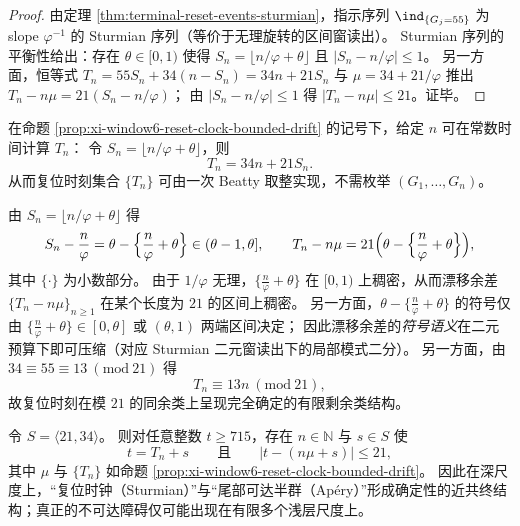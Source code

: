 \begin{proof}
由定理 \ref{thm:terminal-reset-events-sturmian}，指示序列 \(\ind_{\{G_j=55\}}\) 为 slope \(\varphi^{-1}\) 的 Sturmian 序列（等价于无理旋转的区间窗读出）。
Sturmian 序列的平衡性给出：存在 \(\theta\in[0,1)\) 使得
\(
S_n=\lfloor n/\varphi+\theta\rfloor
\)
且 \(|S_n-n/\varphi|\le 1\)。
另一方面，恒等式 \(T_n=55S_n+34(n-S_n)=34n+21S_n\) 与 \(\mu=34+21/\varphi\) 推出
\(
T_n-n\mu=21(S_n-n/\varphi)
\)；
由 \(|S_n-n/\varphi|\le 1\) 得 \(|T_n-n\mu|\le 21\)。证毕。
\end{proof}

\begin{corollary}\label{cor:xi-window6-reset-clock-O1-computable}
在命题 \ref{prop:xi-window6-reset-clock-bounded-drift} 的记号下，给定 \(n\) 可在常数时间计算 \(T_n\)：
令 \(S_n=\lfloor n/\varphi+\theta\rfloor\)，则
\[
T_n=34n+21S_n.
\]
从而复位时刻集合 \(\{T_n\}\) 可由一次 Beatty 取整实现，不需枚举 \((G_1,\dots,G_n)\)。
\end{corollary}

\begin{remark}[漂移余差的旋转表示与同余不变量]\label{rem:xi-window6-reset-clock-residual-rotation-congruence}
由 \(S_n=\lfloor n/\varphi+\theta\rfloor\) 得
\[
S_n-\frac{n}{\varphi}=\theta-\Bigl\{\frac{n}{\varphi}+\theta\Bigr\}\in(\theta-1,\theta],
\qquad
T_n-n\mu=21\Bigl(\theta-\Bigl\{\frac{n}{\varphi}+\theta\Bigr\}\Bigr),
\]
其中 \(\{\cdot\}\) 为小数部分。
由于 \(1/\varphi\) 无理，\(\{\frac{n}{\varphi}+\theta\}\) 在 \([0,1)\) 上稠密，从而漂移余差 \(\{T_n-n\mu\}_{n\ge 1}\) 在某个长度为 \(21\) 的区间上稠密。
另一方面，\(\theta-\{\frac{n}{\varphi}+\theta\}\) 的符号仅由
\(\{\frac{n}{\varphi}+\theta\}\in[0,\theta]\) 或 \((\theta,1)\) 两端区间决定；
因此漂移余差的\emph{符号语义}在二元预算下即可压缩（对应 Sturmian 二元窗读出下的局部模式二分）。
另一方面，由 \(34\equiv 55\equiv 13\ (\mathrm{mod}\ 21)\) 得
\[
T_n\equiv 13n\ (\mathrm{mod}\ 21),
\]
故复位时刻在模 \(21\) 的同余类上呈现完全确定的有限剩余类结构。
\end{remark}

\begin{corollary}\label{cor:xi-window6-reset-clock-semigroup-coupling}
令 \(S=\langle 21,34\rangle\)。
则对任意整数 \(t\ge 715\)，存在 \(n\in\mathbb N\) 与 \(s\in S\) 使
\[
t=T_n+s
\qquad\text{且}\qquad
\bigl|t-(n\mu+s)\bigr|\le 21,
\]
其中 \(\mu\) 与 \(\{T_n\}\) 如命题 \ref{prop:xi-window6-reset-clock-bounded-drift}。
因此在深尺度上，“复位时钟（Sturmian）”与“尾部可达半群（Ap\'ery）”形成确定性的近共终结构；真正的不可达障碍仅可能出现在有限多个浅层尺度上。
\end{corollary}

